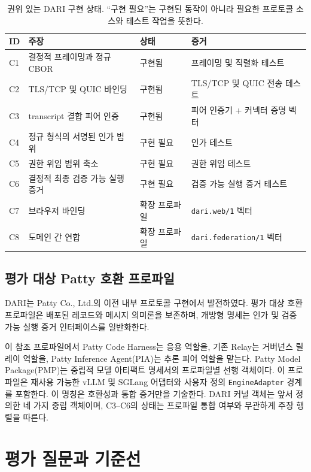 \documentclass[10pt]{article}
\begin{document}
\begin{table}[t]
\centering
\caption{권위 있는 DARI 구현 상태. ``구현 필요''는 구현된 동작이 아니라 필요한 프로토콜 소스와 테스트 작업을 뜻한다.}
\label{tab:claims}
\scriptsize
\begin{tabularx}{\textwidth}{@{}l Y l Y@{}}
\toprule
ID & 주장 & 상태 & 증거 \\
\midrule
C1 & 결정적 프레이밍과 정규 CBOR & 구현됨 & 프레이밍 및 직렬화 테스트 \\
C2 & TLS/TCP 및 QUIC 바인딩 & 구현됨 & TLS/TCP 및 QUIC 전송 테스트 \\
C3 & transcript 결합 피어 인증 & 구현됨 & 피어 인증기 + 커넥터 증명 벡터 \\
C4 & 정규 형식의 서명된 인가 범위 & 구현 필요 & 인가 테스트 \\
C5 & 권한 위임 범위 축소 & 구현 필요 & 권한 위임 테스트 \\
C6 & 결정적 최종 검증 가능 실행 증거 & 구현 필요 & 검증 가능 실행 증거 테스트 \\
C7 & 브라우저 바인딩 & 확장 프로파일 & \texttt{dari.web/1} 벡터 \\
C8 & 도메인 간 연합 & 확장 프로파일 & \texttt{dari.federation/1} 벡터 \\
\bottomrule
\end{tabularx}
\end{table}

\subsection{평가 대상 Patty 호환 프로파일}

DARI는 Patty Co., Ltd.의 이전 내부 프로토콜 구현에서 발전하였다. 평가 대상 호환 프로파일은 배포된 레코드와 메시지 의미론을 보존하며, 개방형 명세는 인가 및 검증 가능 실행 증거 인터페이스를 일반화한다.

이 참조 프로파일에서 Patty Code Harness는 응용 역할을, 기존 Relay는 거버넌스 릴레이 역할을, Patty Inference Agent(PIA)는 추론 피어 역할을 맡는다. Patty Model Package(PMP)는 중립적 모델 아티팩트 명세서의 프로파일별 선행 객체이다. 이 프로파일은 재사용 가능한 vLLM 및 SGLang 어댑터와 사용자 정의 \texttt{EngineAdapter} 경계를 포함한다. 이 명칭은 호환성과 통합 증거만을 기술한다. DARI 커널 객체는 앞서 정의한 네 가지 중립 객체이며, C3--C6의 상태는 프로파일 통합 여부와 무관하게 주장 행렬을 따른다.

\section{평가 질문과 기준선}
\end{document}
